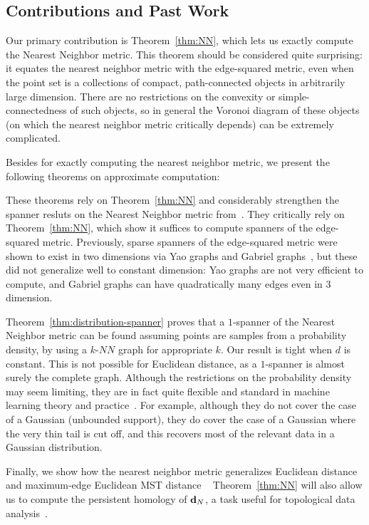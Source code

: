 \subsection{Contributions and Past Work}
Our primary contribution is Theorem~\ref{thm:NN}, which lets us exactly
compute the Nearest Neighbor metric. This theorem should be considered
quite surprising: it equates the nearest neighbor metric with the
edge-squared metric, even when the point set is a collections of compact,
path-connected objects in arbitrarily large dimension. There are no
restrictions on the convexity or simple-connectedness of such objects, so
in general the Voronoi diagram of these objects (on which the nearest
neighbor metric critically depends) can be extremely complicated.

 Besides for exactly computing the nearest neighbor metric, we present the
following theorems on approximate computation:

 
These theorems rely on Theorem~\ref{thm:NN} and considerably strengthen the
spanner resluts on the Nearest Neighbor metric
from~\cite{cohen15approximating}. They critically rely on
Theorem~\ref{thm:NN}, which show it suffices to compute spanners of the
edge-squared metric.
Previously, sparse spanners of the edge-squared metric were shown to exist in two
dimensions via Yao graphs and Gabriel graphs~\cite{LiWan2001}, but these
did not generalize well to constant dimension: Yao
graphs are not very efficient to compute, and Gabriel graphs can have
quadratically many edges even in $3$ dimension.  

Theorem~\ref{thm:distribution-spanner} proves that a $1$-spanner of
the Nearest Neighbor metric can be found assuming points are samples from a
probability density, by using a $k$-$NN$ graph for
appropriate $k$. Our result is tight when $d$ is constant. This
is not possible for Euclidean distance, as a $1$-spanner is almost
surely the complete graph. Although the restrictions on the probability
density may seem limiting,
they are in fact quite flexible and standard in
machine learning theory and practice~\cite{}. For example, although they do not cover the case
of a Gaussian (unbounded support), they do cover the case of a Gaussian
where the very thin tail is cut off, and this recovers most of the relevant
data in a Gaussian distribution.

Finally, we show how the nearest neighbor metric generalizes Euclidean
distance and maximum-edge Euclidean MST distance ~\cite{LiWan2001}
Theorem~\ref{thm:NN} will also allow us
to compute the persistent homology of $\mathbf{d}_N$, a task useful for
topological data analysis~\cite{}. 

